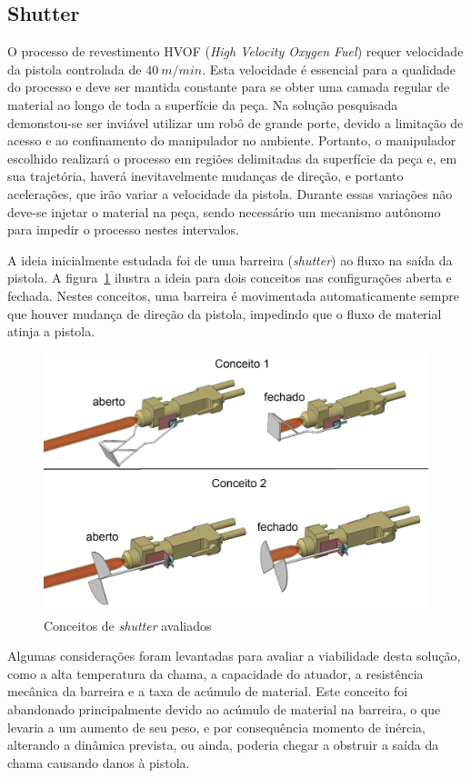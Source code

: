 
\subsection{Shutter}%
O processo de revestimento HVOF (\textit{High Velocity Oxygen Fuel}) requer
velocidade da pistola controlada de $40~m/min$. Esta velocidade é essencial para
a qualidade do processo e deve ser mantida constante para se obter uma camada 
regular de material ao longo de toda a superfície da peça. Na solução
pesquisada demonstou-se ser inviável utilizar um robô de grande porte, devido a
limitação de acesso e ao confinamento do manipulador no ambiente. Portanto, o
manipulador  escolhido realizará o processo em regiões delimitadas da
superfície da peça e, em sua trajetória, haverá inevitavelmente mudanças de
direção, e portanto acelerações, que irão variar a velocidade da pistola.
Durante essas variações não deve-se injetar o material na peça, sendo necessário um mecanismo
autônomo para impedir o processo nestes intervalos.

A ideia inicialmente estudada foi de uma barreira (\textit{shutter}) ao fluxo na
saída da pistola.
A figura~\ref{fig::shutter_todos} ilustra a ideia para dois conceitos nas
configurações aberta e fechada. 
Nestes conceitos, uma barreira é movimentada automaticamente sempre que houver
mudança de direção da pistola, impedindo que o fluxo de material atinja a
pistola. 

\begin{figure}[h!]
   \centering
   \includegraphics[width=0.8\columnwidth]{figs/shutter/shutter_todos}
   \caption{Conceitos de \textit{shutter} avaliados}
   \label{fig::shutter_todos}
\end{figure}

Algumas considerações foram levantadas para avaliar a viabilidade
desta solução, como a alta temperatura da chama, a capacidade do atuador, a
resistência mecânica da barreira e a taxa de acúmulo de material. Este conceito
foi abandonado principalmente devido ao acúmulo de material na barreira, o que
levaria a um aumento de seu peso, e por consequência momento de inércia,
alterando a dinâmica prevista, ou ainda, poderia chegar a obstruir a saída da
chama causando danos à pistola.

